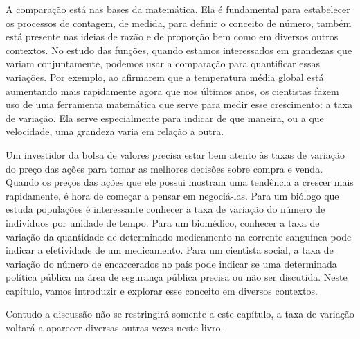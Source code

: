 A comparação está nas bases da matemática. Ela é fundamental para estabelecer os processos de contagem, de medida, para definir o conceito de número, também está presente nas ideias de razão e de proporção bem como em diversos outros contextos. No estudo das funções, quando estamos interessados em grandezas que variam conjuntamente, podemos usar a comparação para quantificar essas variações. Por exemplo, ao afirmarem que a temperatura média global está aumentando mais rapidamente agora que nos últimos anos, os cientistas fazem uso de uma ferramenta matemática que serve para medir esse crescimento: a taxa de variação. Ela serve especialmente para indicar de que maneira, ou a que velocidade, uma grandeza varia em relação a outra. 

Um investidor da bolsa de valores precisa estar bem atento às taxas de variação do preço das ações para tomar as melhores decisões sobre compra e venda. Quando os preços das ações que ele possui mostram uma tendência a crescer mais rapidamente, é hora de começar a pensar em negociá-las. Para um biólogo que estuda populações é interessante conhecer a taxa de variação do número de indivíduos por unidade de tempo. Para um biomédico, conhecer a taxa de variação da quantidade de determinado medicamento na corrente sanguínea pode indicar a efetividade de um medicamento. Para um cientista social, a taxa de variação do número de encarcerados no país pode indicar se uma determinada política pública na área de segurança pública precisa ou não ser discutida. Neste capítulo, vamos introduzir e explorar esse conceito em diversos contextos. 

Contudo a discussão não se restringirá somente a este capítulo, a taxa de variação voltará a aparecer diversas outras vezes neste livro.

